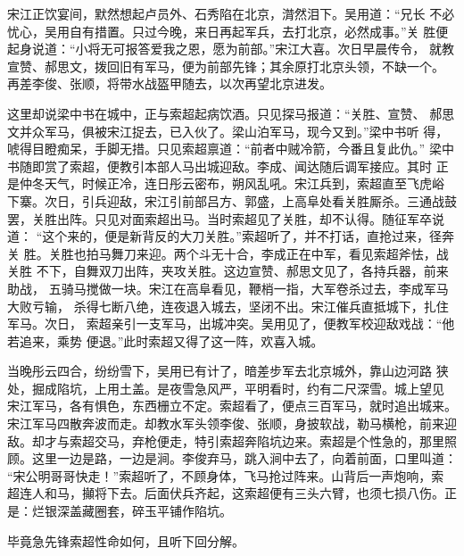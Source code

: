 宋江正饮宴间，默然想起卢员外、石秀陷在北京，潸然泪下。吴用道：“兄长
不必忧心，吴用自有措置。只过今晚，来日再起军兵，去打北京，必然成事。”关
胜便起身说道：“小将无可报答爱我之恩，愿为前部。”宋江大喜。次日早晨传令，
就教宣赞、郝思文，拨回旧有军马，便为前部先锋；其余原打北京头领，不缺一个。
再差李俊、张顺，将带水战盔甲随去，以次再望北京进发。

这里却说梁中书在城中，正与索超起病饮酒。只见探马报道：“关胜、宣赞、
郝思文并众军马，俱被宋江捉去，已入伙了。梁山泊军马，现今又到。”梁中书听
得，唬得目瞪痴呆，手脚无措。只见索超禀道：“前者中贼冷箭，今番且复此仇。”
梁中书随即赏了索超，便教引本部人马出城迎敌。李成、闻达随后调军接应。其时
正是仲冬天气，时候正冷，连日彤云密布，朔风乱吼。宋江兵到，索超直至飞虎峪
下寨。次日，引兵迎敌，宋江引前部吕方、郭盛，上高阜处看关胜厮杀。三通战鼓
罢，关胜出阵。只见对面索超出马。当时索超见了关胜，却不认得。随征军卒说道：
“这个来的，便是新背反的大刀关胜。”索超听了，并不打话，直抢过来，径奔关
胜。关胜也拍马舞刀来迎。两个斗无十合，李成正在中军，看见索超斧怯，战关胜
不下，自舞双刀出阵，夹攻关胜。这边宣赞、郝思文见了，各持兵器，前来助战，
五骑马搅做一块。宋江在高阜看见，鞭梢一指，大军卷杀过去，李成军马大败亏输，
杀得七断八绝，连夜退入城去，坚闭不出。宋江催兵直抵城下，扎住军马。次日，
索超亲引一支军马，出城冲突。吴用见了，便教军校迎敌戏战：“他若追来，乘势
便退。”此时索超又得了这一阵，欢喜入城。

当晚彤云四合，纷纷雪下，吴用已有计了，暗差步军去北京城外，靠山边河路
狭处，掘成陷坑，上用土盖。是夜雪急风严，平明看时，约有二尺深雪。城上望见
宋江军马，各有惧色，东西栅立不定。索超看了，便点三百军马，就时追出城来。
宋江军马四散奔波而走。却教水军头领李俊、张顺，身披软战，勒马横枪，前来迎
敌。却才与索超交马，弃枪便走，特引索超奔陷坑边来。索超是个性急的，那里照
顾。这里一边是路，一边是涧。李俊弃马，跳入涧中去了，向着前面，口里叫道：
“宋公明哥哥快走！”索超听了，不顾身体，飞马抢过阵来。山背后一声炮响，索
超连人和马，攧将下去。后面伏兵齐起，这索超便有三头六臂，也须七损八伤。正
是：烂银深盖藏圈套，碎玉平铺作陷坑。

毕竟急先锋索超性命如何，且听下回分解。
